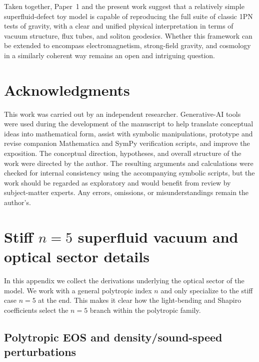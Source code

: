 \documentclass[11pt]{article}
\begin{document}
\medskip

Taken together, Paper~1 and the present work suggest that a relatively
simple superfluid-defect toy model is capable of reproducing the full
suite of classic 1PN tests of gravity, with a clear and unified physical
interpretation in terms of vacuum structure, flux tubes, and soliton
geodesics.
Whether this framework can be extended to encompass electromagnetism,
strong-field gravity, and cosmology in a similarly coherent way remains an
open and intriguing question.

\section*{Acknowledgments}

This work was carried out by an independent researcher. Generative-AI tools were used during the development of the manuscript to help translate conceptual ideas into mathematical form, assist with symbolic manipulations, prototype and revise companion Mathematica and SymPy verification scripts, and improve the exposition. The conceptual direction, hypotheses, and overall structure of the work were directed by the author. The resulting arguments and calculations were checked for internal consistency using the accompanying symbolic scripts, but the work should be regarded as exploratory and would benefit from review by subject-matter experts. Any errors, omissions, or misunderstandings remain the author’s.

\medskip

\appendix

\section{Stiff \texorpdfstring{$n=5$}{n=5} superfluid vacuum and optical sector details}
\label{app:n5-optical}

In this appendix we collect the derivations underlying the optical sector
of the model.
We work with a general polytropic index $n$ and only specialize to the
stiff case $n=5$ at the end.
This makes it clear how the light-bending and Shapiro coefficients select
the $n=5$ branch within the polytropic family.


\subsection{Polytropic EOS and density/sound-speed perturbations}
\label{subsec:app-eos}
\end{document}
